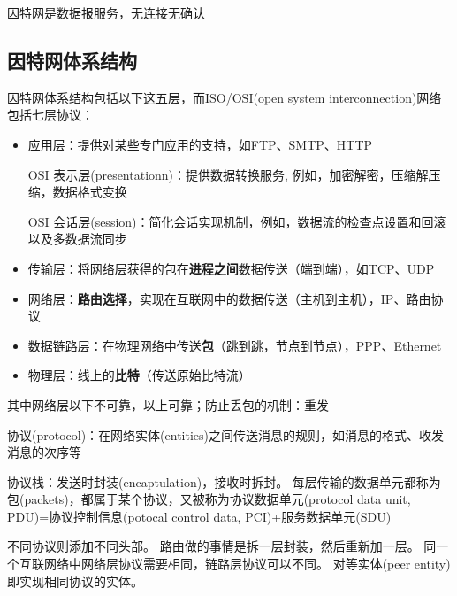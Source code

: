 因特网是数据报服务，无连接无确认

\subsection{因特网体系结构}
因特网体系结构包括以下这五层，而ISO/OSI(open system interconnection)网络包括七层协议：
\begin{itemize}
	\item 应用层：提供对某些专门应用的支持，如FTP、SMTP、HTTP
	\item [OSI]表示层(presentationn)：提供数据转换服务, 例如，加密解密，压缩解压缩，数据格式变换
	\item [OSI]会话层(session)：简化会话实现机制，例如，数据流的检查点设置和回滚以及多数据流同步
	\item 传输层：将网络层获得的包在\textbf{进程之间}数据传送（端到端），如TCP、UDP
	\item 网络层：\textbf{路由选择}，实现在互联网中的数据传送（主机到主机），IP、路由协议
	\item 数据链路层：在物理网络中传送\textbf{包}（跳到跳，节点到节点），PPP、Ethernet
	\item 物理层：线上的\textbf{比特}（传送原始比特流）
\end{itemize}
\par 其中网络层以下不可靠，以上可靠；防止丢包的机制：重发

协议(protocol)：在网络实体(entities)之间传送消息的规则，如消息的格式、收发消息的次序等

协议栈：发送时封装(encaptulation)，接收时拆封。
每层传输的数据单元都称为包(packets)，都属于某个协议，又被称为协议数据单元(protocol data unit, PDU)=协议控制信息(potocal control data, PCI)+服务数据单元(SDU)
\begin{center}
\end{center}

不同协议则添加不同头部。
路由做的事情是拆一层封装，然后重新加一层。
同一个互联网络中网络层协议需要相同，链路层协议可以不同。
对等实体(peer entity)即实现相同协议的实体。

